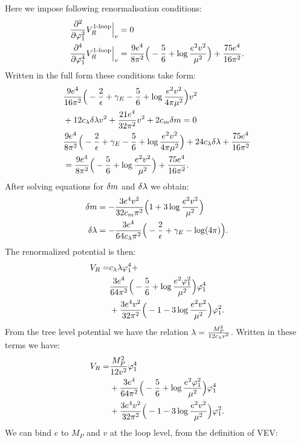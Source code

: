 Here we impose following renormalisation conditions:
\begin{align}
\frac{\partial^2 }{\partial \varphi_1^2}V_R^{\textrm{1-loop}}\Big|_{v} &= 0 \\
\frac{\partial^4 }{\partial \varphi_1^4}V_R^{\textrm{1-loop}}\Big|_{v} &= \frac{9e^4}{8\pi^2}\Big(-\frac{5}{6}+\log\frac{e^2
v^2}{\mu^2}\Big)
+\frac{75e^4}{16\pi^2}.
\end{align}
Written in the full form these conditions take form:
\begin{align}
&\frac{9e^4}{16\pi^2}\Big(-\frac{2}{\epsilon}+\gamma_E-\frac{5}{6}+\log\frac{e^2
v^2}{4\pi\mu^2}\Big)v^2 \notag\\
&+ 12c_\lambda\delta\lambda v^2+\frac{21e^4}{32\pi^2}v^2+2c_m\delta m = 0 \\
&\frac{9e^4}{8\pi^2}\Big(-\frac{2}{\epsilon}+\gamma_E-\frac{5}{6}+\log\frac{e^2v^2}{4\pi\mu^2}\Big)+
24c_\lambda\delta\lambda+\frac{75e^4}{16\pi^2}  \notag \\
&=\frac{9e^4}{8\pi^2}\Big(-\frac{5}{6}+\log\frac{e^2v^2}{\mu^2}\Big)+\frac{75e^4}{16\pi^2}.
\end{align}
After solving equations for $\delta m$ and $\delta\lambda$ we obtain:
\begin{align}
\delta m &= -\frac{3e^4v^2}{32c_m\pi^2}\Big(1+3
\log\frac{e^2v^2}{\mu^2}\Big) \\
\delta\lambda &= -\frac{3e^4}{64c_\lambda\pi^2}\Big(-\frac{2}{\epsilon}+\gamma_E-\log(4\pi)\Big).
\end{align}
The renormalized potential is then:
\begin{align}
V_R = &c_\lambda\lambda\varphi_1^4 + \notag \\ 
&\frac{3e^4}{64\pi^2}\Big(-\frac{5}{6}+\log\frac{e^2\varphi_1^2}{\mu^2}\Big)\varphi_1^4 \notag\\
&+\frac{3e^4v^2}{32\pi^2}\Big(-1-3\log\frac{e^2v^2}{\mu^2}\Big)\varphi_1^2.
\end{align}
From the tree level potential we have the relation $\lambda = \frac{M_P^2}{12c_\lambda v^2}$. 
Written in these terms we have:
\begin{align}
V_R = &\frac{M_P^2}{12v^2}\varphi_1^4  \notag \\ 
&+\frac{3e^4}{64\pi^2}\Big(-\frac{5}{6}+\log\frac{e^2\varphi_1^2}{\mu^2}\Big)\varphi_1^4 \notag\\
&+\frac{3e^4v^2}{32\pi^2}\Big(-1-3\log\frac{e^2v^2}{\mu^2}\Big)\varphi_1^2.
\end{align}
We can bind $e$ to $M_P$ and $v$ at the loop level, from the definition of VEV:
